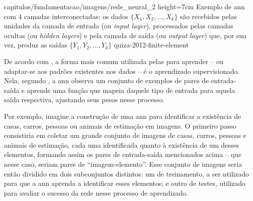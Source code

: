     {capitulos/fundamentacao/imagens/rede_neural_2} %
    {height=7cm} %
    {Exemplo de \acrfull{ann} com 4 camadas interconectadas: os dados \(\{X_1, X_2, \dots, X_k\}\) são recebidos pelas unidades da camada de entrada (ou \textit{input layer}), processados pelas camadas ocultas (ou \textit{hidden layers}) e pela camada de saída (ou \textit{output layer}) que, por sua vez, produz as saídas \(\{Y_1, Y_2, \dots, Y_k\}\)} %
    {quiza-2012-finite-element} %




De acordo com , a forma mais comum utilizada pelas  para aprender -- ou adaptar-se aos padrões existentes nos dados -- é o aprendizado supervisionado.
Nela, segundo , a \acrshort{ann} observa um conjunto de exemplos de pares de entrada-saída e aprende uma função que mapeia daquele tipo de entrada para aquela saída respectiva, ajustando seus pesos nesse processo.

Por exemplo, imagine a construção de uma \acrshort{ann} para identificar a existência de casas, carros, pessoas ou animais de estimação em imagens. O primeiro passo consistiria em coletar um grande conjunto de imagens de casas, carros, pessoas e animais de estimação, cada uma identificada quanto à existência de um desses elementos, formando assim os pares de entrada-saída mencionados acima -- que nesse caso, seriam pares de ``imagem-elemento''.
Esse conjunto de imagens seria então dividido em dois subconjuntos distintos: um de treinamento, a ser utilizado para que a \acrshort{ann} aprenda a identificar esses elementos; e outro de testes, utilizado para avaliar o sucesso da rede nesse processo de aprendizado.

